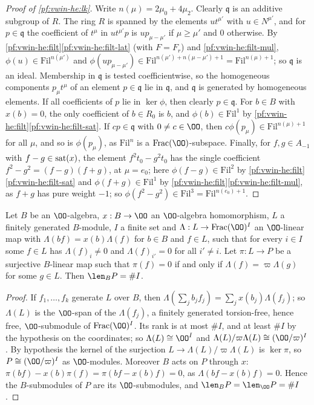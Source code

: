 \begin{proof}[Proof of \cref{pf:vwin-he:lk}]
Write $n(\mu)=2\mu_0+4\mu_2$. Clearly $\mathfrak q$ is an additive subgroup of $R$. The ring $R$ is spanned by the
elements $ut^{\mu'}$ with $u\in N^{\mu'}$, and for $p\in\mathfrak q$ the coefficient of $t^\mu$ in $ut^{\mu'}p$ is
$up_{\mu-\mu'}$ if $\mu\ge\mu'$ and $0$ otherwise. By \cref{pf:vwin-he:filt}\ref{pf:vwin-he:filt-lat} (with $F=F_r$)
and \ref{pf:vwin-he:filt-mul}, $\phi(u)\in\mathrm{Fil}^{n(\mu')}$ and
$\phi(up_{\mu-\mu'})\in\mathrm{Fil}^{n(\mu')+n(\mu-\mu')+1}=\mathrm{Fil}^{n(\mu)+1}$; so $\mathfrak q$ is an ideal.
Membership in $\mathfrak q$ is tested coefficientwise, so the homogeneous components $p_\mu t^\mu$ of an element
$p\in\mathfrak q$ lie in $\mathfrak q$, and $\mathfrak q$ is generated by homogeneous elements. If all coefficients of
$p$ lie in $\ker\phi$, then clearly $p\in\mathfrak q$. For $b\in B$ with $x(b)=0$, the only coefficient of
$b\in R_0$ is $b$, and $\phi(b)\in\mathrm{Fil}^1$ by \cref{pf:vwin-he:filt}\ref{pf:vwin-he:filt-sat}. If
$cp\in\mathfrak q$ with $0\ne c\in\OO$, then $c\phi(p_\mu)\in\mathrm{Fil}^{n(\mu)+1}$ for all $\mu$, and so is
$\phi(p_\mu)$, as $\mathrm{Fil}^n$ is a $\mathrm{Frac}(\OO)$-subspace. Finally, for $f,g\in A_{-1}$ with
$f-g\in\operatorname{sat}(x)$, the element $f^2t_0-g^2t_0$ has the single coefficient $f^2-g^2=(f-g)(f+g)$, at $\mu=e_0$; here
$\phi(f-g)\in\mathrm{Fil}^2$ by \cref{pf:vwin-he:filt}\ref{pf:vwin-he:filt-sat} and $\phi(f+g)\in\mathrm{Fil}^1$ by
\cref{pf:vwin-he:filt}\ref{pf:vwin-he:filt-mul}, as $f+g$ has pure weight $-1$; so
$\phi(f^2-g^2)\in\mathrm{Fil}^3=\mathrm{Fil}^{n(e_0)+1}$.
\end{proof}

\begin{lemma}\label{pf:vwin-he:diag}
Let $B$ be an $\OO$-algebra, $x:B\to\OO$ an $\OO$-algebra homomorphism, $L$ a finitely generated $B$-module, $I$ a
finite set and $\Lambda:L\to\mathrm{Frac}(\OO)^I$ an $\OO$-linear map with $\Lambda(bf)=x(b)\Lambda(f)$ for $b\in B$
and $f\in L$, such that for every $i\in I$ some $f\in L$ has $\Lambda(f)_i\ne0$ and $\Lambda(f)_{i'}=0$ for all
$i'\ne i$. Let $\pi:L\to P$ be a surjective $B$-linear map such that $\pi(f)=0$ if and only if
$\Lambda(f)=\varpi\Lambda(g)$ for some $g\in L$. Then $\len_BP=\#I$.
\end{lemma}

\begin{proof}
If $f_1,\dots,f_k$ generate $L$ over $B$, then $\Lambda(\sum_jb_jf_j)=\sum_jx(b_j)\Lambda(f_j)$; so $\Lambda(L)$ is
the $\OO$-span of the $\Lambda(f_j)$, a finitely generated torsion-free, hence free, $\OO$-submodule of
$\mathrm{Frac}(\OO)^I$. Its rank is at most $\#I$, and at least $\#I$ by the hypothesis on the coordinates; so
$\Lambda(L)\cong\OO^I$ and $\Lambda(L)/\varpi\Lambda(L)\cong(\OO/\varpi)^I$. By hypothesis the kernel of the
surjection $L\to\Lambda(L)/\varpi\Lambda(L)$ is $\ker\pi$, so $P\cong(\OO/\varpi)^I$ as $\OO$-modules. Moreover $B$
acts on $P$ through $x$: $\pi(bf)-x(b)\pi(f)=\pi(bf-x(b)f)=0$, as $\Lambda(bf-x(b)f)=0$. Hence the $B$-submodules of
$P$ are its $\OO$-submodules, and $\len_BP=\len_\OO P=\#I$.
\end{proof}

